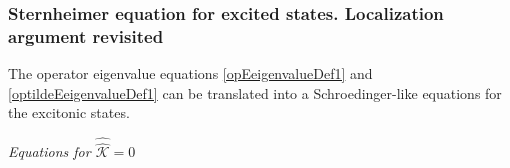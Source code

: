 \documentclass[a4paper]{article}
\newcommand{\dd}{{\rm d}}
\newcommand{\sint}{\mathrlap{\displaystyle\int}
\mathrlap{\textstyle\sum}
\phantom{\mathrlap{\displaystyle
\int}\textstyle\sum}}
\newcommand{\be}{\begin{equation}}
\newcommand{\ee}{\end{equation}}
\newcommand{\nn}{\notag}
\newcommand{\qq}{\qquad}
\newcommand{\lb}{\label}
\newcommand{\op}[1]{\hat {#1}}
\newcommand{\sop}[1]{\op{\op {#1}}}
\newcommand{\tket}[1]{| \tilde #1 \rangle}
\newcommand{\tbra}[1]{\langle \tilde #1 |}
\newcommand{\dmnot}{\op{\rho}_0}
\newcommand{\coupl}{\sop{\mathcal K}}
\begin{document}
\subsubsection{Sternheimer equation for excited states. Localization argument revisited}

The operator eigenvalue equations \eqref{opEeigenvalueDef1} and \eqref{optildeEeigenvalueDef1} can be translated into a Schroedinger-like equations
for the excitonic states. 

\vspace{0.5cm}
\emph{Equations for $\coupl = 0$}
\vspace{0.5cm}
\end{document}
